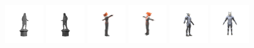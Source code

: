 \begin{figure}[htbp]
  \centering
  \includegraphics[width=0.15\textwidth]{images/data/samples/1.1.jpeg}\hspace{0.01\textwidth}%
  \includegraphics[width=0.15\textwidth]{images/data/samples/1.2.jpeg}\hfill
  \includegraphics[width=0.15\textwidth]{images/data/samples/2.1.jpeg}\hspace{0.01\textwidth}%
  \includegraphics[width=0.15\textwidth]{images/data/samples/2.2.jpeg}\hfill
  \includegraphics[width=0.15\textwidth]{images/data/samples/3.1.jpeg}\hspace{0.01\textwidth}%
  \includegraphics[width=0.15\textwidth]{images/data/samples/3.2.jpeg}\\\\
  \vspace{2mm} %


\end{figure}
